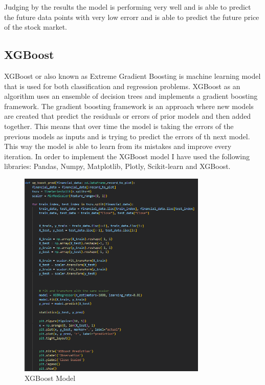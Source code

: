 \documentclass{imc-inf}
\begin{document}
			Judging by the results the model is performing very well and is able to predict the future data points with very low errorr and is able to predict the future price of the stock market.
			
	
		
		\subsection{XGBoost}
			XGBoost or also known as Extreme Gradient Boosting is machine learning model that is used for both classification and regression problems. XGBoost as an algorithm uses an ensemble of decision trees
			and implements a gradient boosting framework. The gradient boosting framework is an approach where new models are created that predict the residuals or errors of prior models and then added together.
			This means that over time the model is taking the errors of the previous models as inputs and is trying to predict the errors of th next model. This way the model is able to learn from its mistakes and improve every
			iteration. In order to implement the XGBoost model I have used the following libraries: Pandas, Numpy, Matplotlib, Plotly, Scikit-learn and XGBoost. 
			\begin{figure}[h]
				\centering
				\includegraphics[width=0.8\textwidth]{xgboost_code.png}
				\caption{XGBoost Model}
				\label{fig:xgboost_model}
			\end{figure}
\end{document}
